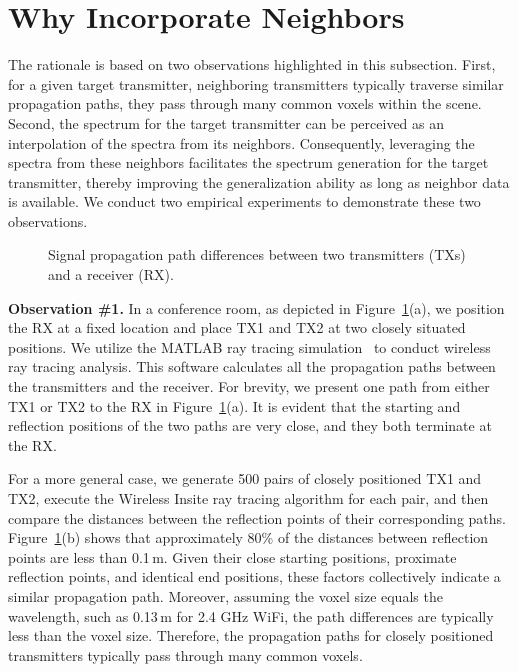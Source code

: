 
\section{Why Incorporate Neighbors}\label{sec_design_neighbors}
The rationale is based on two observations highlighted in this subsection.
First, for a given target transmitter, neighboring transmitters typically traverse similar propagation paths, \ie they pass through many common voxels within the scene.
Second, the spectrum for the target transmitter can be perceived as an interpolation of the spectra from its neighbors.
Consequently, leveraging the spectra from these neighbors facilitates the spectrum generation for the target transmitter, thereby improving the generalization ability as long as neighbor data is available.
We conduct two empirical experiments to demonstrate these two observations.



\begin{figure}[t]
\centering
	\vspace{-0.15in}
\caption{Signal propagation path differences between two transmitters (TXs) and a receiver (RX).}
\label{fig_scene_moti_1}
\end{figure}



\textbf{Observation \#1.}
In a conference room, as depicted in Figure~\ref{fig_scene_moti_1}(a), we position the RX at a fixed location and place TX1 and TX2 at two closely situated positions.
We utilize the MATLAB ray tracing simulation~\cite{matlab_indoor_simulation} to conduct wireless ray tracing analysis.
This software calculates all the propagation paths between the transmitters and the receiver.
For brevity, we present one path from either TX1 or TX2 to the RX in Figure~\ref{fig_scene_moti_1}(a).
It is evident that the starting and reflection positions of the two paths are very close, and they both terminate at the RX.


For a more general case, we generate 500 pairs of closely positioned TX1 and TX2, execute the Wireless Insite ray tracing algorithm for each pair, and then compare the distances between the reflection points of their corresponding paths.
Figure~\ref{fig_scene_moti_1}(b) shows that approximately 80\% of the distances between reflection points are less than 0.1\,m.
Given their close starting positions, proximate reflection points, and identical end positions, these factors collectively indicate a similar propagation path.
Moreover, assuming the voxel size equals the wavelength, such as 0.13\,m for 2.4 GHz WiFi, the path differences are typically less than the voxel size.
Therefore, the propagation paths for closely positioned transmitters typically pass through many common voxels.



